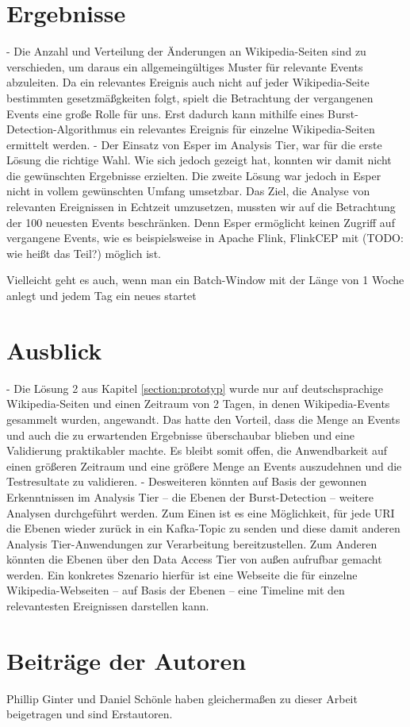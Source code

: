 \section{Ergebnisse}
- Die Anzahl und Verteilung der Änderungen an Wikipedia-Seiten sind zu verschieden, um daraus ein allgemeingültiges Muster für relevante Events abzuleiten.
Da ein relevantes Ereignis auch nicht auf jeder Wikipedia-Seite bestimmten gesetzmäßgkeiten folgt, spielt die Betrachtung der vergangenen Events eine große Rolle für uns.
Erst dadurch kann mithilfe eines Burst-Detection-Algorithmus ein relevantes Ereignis für einzelne Wikipedia-Seiten ermittelt werden.
- Der Einsatz von Esper im Analysis Tier, war für die erste Lösung die richtige Wahl. Wie sich jedoch gezeigt hat, konnten wir damit
nicht die gewünschten Ergebnisse erzielten. Die zweite Lösung war jedoch in Esper nicht in vollem gewünschten Umfang umsetzbar.
Das Ziel, die Analyse von relevanten Ereignissen in Echtzeit umzusetzen, mussten wir auf die Betrachtung der 100 neuesten Events beschränken.
Denn Esper ermöglicht keinen Zugriff auf vergangene Events, wie es beispielsweise in Apache Flink, FlinkCEP mit (TODO: wie heißt das Teil?) möglich ist.

Vielleicht geht es auch, wenn man ein Batch-Window mit der Länge von 1 Woche anlegt und jedem Tag ein neues startet

\section{Ausblick}
- Die Lösung 2 aus Kapitel \ref{section:prototyp} wurde nur auf deutschsprachige Wikipedia-Seiten und einen Zeitraum von 2 Tagen, in denen Wikipedia-Events gesammelt wurden, angewandt.
Das hatte den Vorteil, dass die Menge an Events und auch die zu erwartenden Ergebnisse überschaubar blieben und eine Validierung praktikabler machte.
Es bleibt somit offen, die Anwendbarkeit auf einen größeren Zeitraum und eine größere Menge an Events auszudehnen und die Testresultate zu validieren.
- Desweiteren könnten auf Basis der gewonnen Erkenntnissen im Analysis Tier -- die Ebenen der Burst-Detection -- weitere Analysen durchgeführt werden.
Zum Einen ist es eine Möglichkeit, für jede URI die Ebenen wieder zurück in ein Kafka-Topic zu senden und diese damit anderen Analysis Tier-Anwendungen zur Verarbeitung bereitzustellen.
Zum Anderen könnten die Ebenen über den Data Access Tier von außen aufrufbar gemacht werden. Ein konkretes Szenario hierfür ist eine Webseite
die für einzelne Wikipedia-Webseiten -- auf Basis der Ebenen -- eine Timeline mit den relevantesten Ereignissen darstellen kann.

\section{Beiträge der Autoren}
 Phillip Ginter und Daniel Schönle haben gleichermaßen zu dieser Arbeit beigetragen und sind Erstautoren.
